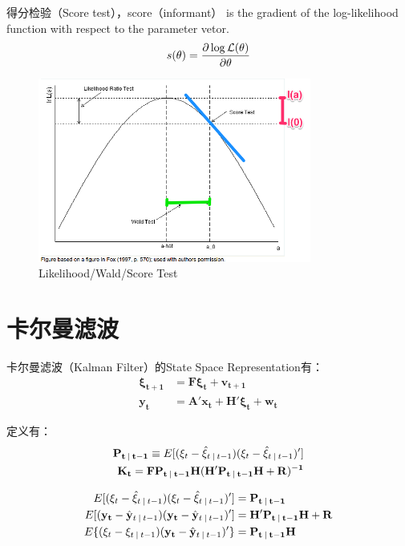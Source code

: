 \documentclass[11pt]{article}
\begin{document}
得分检验（Score test），score（informant） is the gradient of the log-likelihood function with respect to the parameter vetor.
\begin{equation*}
    s(\theta) = \frac{\partial \log \mathcal{L}(\theta)}{\partial \theta}
\end{equation*}

\begin{figure}[H]
    \centering
    \includegraphics[width=0.8\textwidth]{fig/W-L-S-test.png}
    \caption{Likelihood/Wald/Score Test}
\end{figure}

\section{卡尔曼滤波}

卡尔曼滤波（Kalman Filter）的State Space Representation有：
\begin{align*}
   \mathbf{\xi_{t+1}} &= \mathbf{F \xi_{t}} + \mathbf{v_{t+1}} \\
   \mathbf{y_{t}} &= \mathbf{A'} \mathbf{x_{t}} + \mathbf{H'\xi_{t}} + \mathbf{w_t}
\end{align*}

定义有：
\begin{align*}
    \mathbf{P_{t\:\vert\: t-1}} \equiv E[(\xi_{t} - \hat{\xi}_{t\:\vert\: t-1})(\xi_{t} - \hat{\xi}_{t\:\vert\: t-1})'] \\
    \mathbf{K_t} = \mathbf{FP_{t\:\vert\: t-1}H(H'P_{t\:\vert\: t-1}H+R)^{-1}}
\end{align*}

\begin{align*}
    E[(\xi_{t} - \hat{\xi}_{t\:\vert\: t-1})(\xi_{t} - \hat{\xi}_{t\:\vert\: t-1})'] &= \mathbf{P_{t\:\vert\: t-1}} \\ E[(\mathbf{y_t} - \hat{\mathbf{y}}_{t\:\vert\: t-1})(\mathbf{y_t} - \hat{\mathbf{y}}_{t\:\vert\: t-1})'] &= \mathbf{H'P_{t\:\vert\: t-1}H+R} \\
    E\{(\xi_t - \xi_{t\:\vert\: t-1})(\mathbf{y_t} - \hat{\mathbf{y}}_{t\:\vert\: t-1})'\} &= \mathbf{P_{t\:\vert\: t-1}H} \\
\end{align*}
\end{document}
